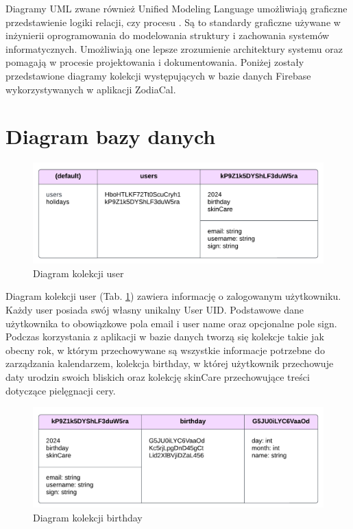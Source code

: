 Diagramy UML zwane również Unified Modeling Language umożliwiają graficzne przedstawienie logiki relacji, czy procesu \cite{diagram}. Są to standardy graficzne używane w inżynierii oprogramowania do modelowania struktury i zachowania systemów informatycznych. Umożliwiają one lepsze zrozumienie architektury systemu oraz pomagają w procesie projektowania i dokumentowania. Poniżej zostały przedstawione diagramy kolekcji występujących w bazie danych Firebase wykorzystywanych w aplikacji ZodiaCal.

\section{Diagram bazy danych}

\begin{figure}[h]
	\centering
	\includegraphics[width=1\linewidth]{images/model_danych/user}
	\caption{Diagram kolekcji user}
	\label{fig:user}
\end{figure}

Diagram kolekcji user (Tab. \ref{fig:user}) zawiera informację o zalogowanym użytkowniku. Każdy user posiada swój własny unikalny User UID. Podstawowe dane użytkownika to obowiązkowe pola email i user name oraz opcjonalne pole sign. Podczas korzystania z aplikacji w bazie danych tworzą się kolekcje takie jak obecny rok, w którym przechowywane są wszystkie informacje potrzebne do zarządzania kalendarzem, kolekcja birthday, w której użytkownik przechowuje daty urodzin swoich bliskich oraz kolekcję skinCare przechowujące treści dotyczące pielęgnacji cery.

\newpage

\begin{figure}[h]
	\centering
	\includegraphics[width=1\linewidth]{images/model_danych/birthday}
	\caption{Diagram kolekcji birthday}
	\label{fig:birthday}
\end{figure}

